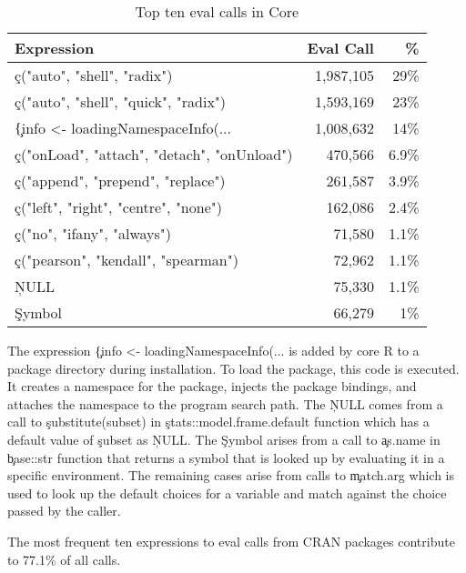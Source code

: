 \documentclass[USenglish,cleveref, autoref, thm-restate]{lipics-v2019}
\begin{document}
\begin{table}[!h] \centering
\begin{tabular}{@{}l|rr@{}} \hline
Expression & Eval Call &  \% \\\hline
\c{c("auto", "shell", "radix")} & 1,987,105 & 29\%\\
\c{c("auto", "shell", "quick", "radix")} & 1,593,169  & 23\%\\
\c{\{info <- loadingNamespaceInfo(...} & 1,008,632 &       14\%\\
\c{c("onLoad", "attach", "detach", "onUnload")}   & 470,566 &      6.9\%\\
\c{c("append", "prepend", "replace")} &              261,587&       3.9\% \\
\c{c("left", "right", "centre", "none")} & 162,086     & 2.4\%\\
\c{c("no", "ifany", "always")}   &                71,580 &       1.1\%\\
\c{c("pearson", "kendall", "spearman")}  & 72,962 &      1.1\%\\
\c{NULL}& 75,330  &      1.1\% \\
\c{Symbol}&                 66,279&       1\%\\\hline
\end{tabular}
\caption{Top ten eval calls in Core}\label{B}
\end{table}

The expression \c{\{info <- loadingNamespaceInfo(...} is added by core
R to a package directory during installation. To load the package,
this code is executed. It creates a namespace for the package, injects
the package bindings, and attaches the namespace to the program search
path. The \c{NULL} comes from a call to \c{substitute(subset)} in
\c{stats::model.frame.default} function which has a default value of
\c{subset} as \c{NULL}. The \c{Symbol} arises from a call to
\c{as.name} in \c{base::str} function that returns a symbol that is
looked up by evaluating it in a specific environment. The remaining
cases arise from calls to \c{match.arg} which is used to look up the
default choices for a variable and match against the choice passed by
the caller.

The most frequent ten expressions to eval calls from CRAN packages
contribute to 77.1\% of all \eval calls.
\end{document}
